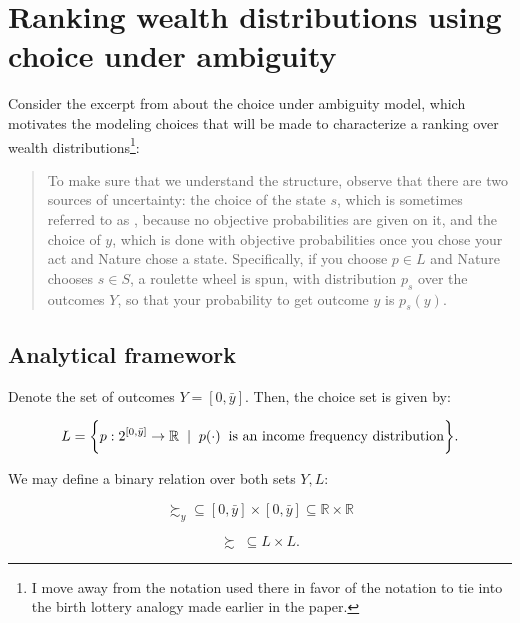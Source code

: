 \documentclass[../../../00-main.tex]{subfiles}
\begin{document}
\section{Ranking wealth distributions using choice under ambiguity}
\label{sec:ExtendedModel}

\par Consider the excerpt from \cite{g09} about the choice under ambiguity model, which motivates the modeling choices that will be made to characterize a ranking over wealth distributions\footnote{I move away from the notation used there in favor of the  notation to tie into the birth lottery analogy made earlier in the paper.}:

\begin{quote}


To make sure that we understand the structure, observe that there are two sources of uncertainty: the choice of the state $s$, which is sometimes referred to as , because no objective probabilities are given on it, and the choice of $y$, which is done with objective probabilities once you chose your act and Nature chose a state. Specifically, if you choose $p \in L$ and Nature chooses $s \in S$, a roulette wheel is spun, with distribution $p_s$ over the outcomes $Y$, so that your probability to get outcome $y$ is $p_s(y)$.

\end{quote}

\subsection{Analytical framework}

\par Denote the set of outcomes $Y = [0,\bar{y}]$. Then, the choice set is given by:

$$ L = \bigg\{ p: 2^{[0,\bar{y}]} \to \mathbb{R} \hspace{2mm} | \hspace{2mm} p(\cdot) \hspace{2mm} \text{is an income frequency distribution}  \bigg\}. $$

\par We may define a binary relation over both sets $Y,L:$

$$ \succsim_{y} \subseteq [0,\bar{y}] \times [0,\bar{y}] \subseteq \mathbb{R} \times \mathbb{R} $$

$$ \succsim \; \subseteq L \times L. $$
\end{document}
